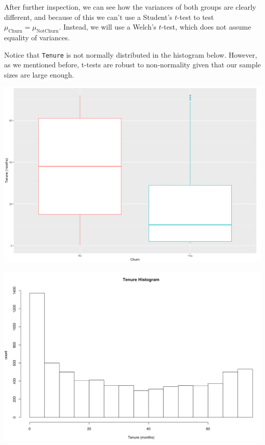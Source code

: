 \documentclass[man, floatsintext]{apa6}
\begin{document}
After further inspection, we can see how the variances of both groups are clearly different, and because of this we can't use a Student's $t$-test to test $\mu_{\text{Churn}} = \mu_{\text{NotChurn}}$. Instead, we will use a Welch's $t$-test, which does not assume equality of variances.

Notice that \texttt{Tenure} is not normally distributed in the histogram below. However, as we mentioned before, t-tests are robust to non-normality given that our sample sizes are large enough.

\hspace{0.5mm}

\noindent\begin{minipage}{0.485\textwidth}
\includegraphics[width = \linewidth]{boxplot_tenurebyChurn}
\end{minipage}
\hfill
\begin{minipage}{0.5\textwidth}
\includegraphics[width = \linewidth]{histogram_Tenure}
\end{minipage}
\end{document}
